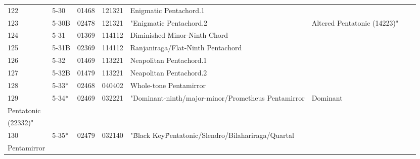 \begin{table}[h]
\begin{tabular}{lllll}
122                    & 5-30                & 01468   & 121321    & Enigmatic Pentachord.1                                     &                             &                   &      &     \\
123                    & 5-30B               & 02478   & 121321    & "Enigmatic Pentachord.2                                    & Altered Pentatonic (14223)" &                   &      &     \\
124                    & 5-31                & 01369   & 114112    & Diminished Minor-Ninth Chord                               &                             &                   &      &     \\
125                    & 5-31B               & 02369   & 114112    & Ranjaniraga/Flat-Ninth Pentachord                          &                             &                   &      &     \\
126                    & 5-32                & 01469   & 113221    & Neapolitan Pentachord.1                                    &                             &                   &      &     \\
127                    & 5-32B               & 01479   & 113221    & Neapolitan Pentachord.2                                    &                             &                   &      &     \\
128                    & 5-33*               & 02468   & 040402    & Whole-tone Pentamirror                                     &                             &                   &      &     \\
129                    & 5-34*               & 02469   & 032221    & "Dominant-ninth/major-minor/Prometheus Pentamirror         & Dominant                    &                   &      &     \\
Pentatonic             &                     &         &           &                                                            &                             &                   &      &     \\
(22332)"               &                     &         &           &                                                            &                             &                   &      &     \\
130                    & 5-35*               & 02479   & 032140    & "\"Black Key\" Pentatonic/Slendro/Bilahariraga/Quartal     &                             &                   &      &     \\
Pentamirror            &                     &         &           &                                                            &                             &                   &      &     \\

\end{tabular}
\end{table}

